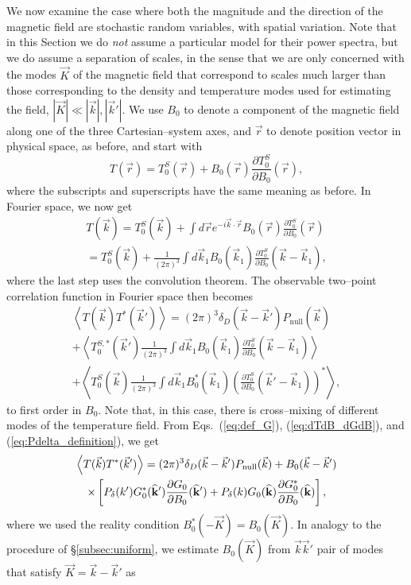 \documentclass[aps,prd,twocolumn,floatfix,showpacs,superscriptaddress,nofootinbib]{revtex4-1}
\newcommand{\beq}{\begin{equation}}
\newcommand{\eeq}{\end{equation}}
\newcommand{\bga}{\begin{gathered}}
\newcommand{\ega}{\end{gathered}}
\begin{document}
We now examine the case where both the magnitude and the direction of the magnetic field are stochastic random variables, with spatial variation. Note that in this Section we do \textit{not} assume a particular model for their power spectra, but we do assume a separation of scales, in the sense that we are only concerned with the modes $\vec K$ of the magnetic field that correspond to scales much larger than those corresponding to the density and temperature modes used for estimating the field, $|\vec K|\ll|\vec k|,|\vec k'|$. We use $B_0$ to denote a component of the magnetic field along one of the three Cartesian--system axes, and $\vec r$ to denote position vector in physical space, as before, and start with 
\beq
T(\vec r) = T^S_0(\vec r) + B_0(\vec r)\frac{\partial T^S_0}{\partial B_0}(\vec r),
\eeq
where the subscripts and superscripts have the same meaning as before. In Fourier space, we now get
\beq
\bga
T(\vec k) = T^S_0(\vec k) + \int d\vec r e^{-i\vec k \cdot \vec r} B_0(\vec r) \frac{\partial T^S_0}{\partial B_0}(\vec r)\\
= T^S_0(\vec k) + \frac{1}{(2\pi)^3}\int d\vec k_1B_0(\vec k_1) \frac{\partial T^S_0}{\partial B_0}(\vec k-\vec k_1),
\ega
\eeq
where the last step uses the convolution theorem. The observable two--point correlation function in Fourier space then becomes
\beq
\bga
\left < T(\vec k)T^*(\vec k')\right > = (2\pi)^3\delta_D(\vec k-\vec k')P_\text{null}(\vec k)\\
+ \left <T_0^{S,*}(\vec k')\frac{1}{(2\pi)^3}\int d\vec k_1 B_0(\vec k_1) \frac{\partial T^S_0}{\partial B_0}(\vec k-\vec k_1)\right > \\
+ \left <T^S_0(\vec k)\frac{1}{(2\pi)^3}\int d\vec k_1 B_0^*(\vec k_1) \left(\frac{\partial T^S_0}{\partial B_0}(\vec k'-\vec k_1)\right)^*\right >, 
\ega
\eeq
to first order in $B_0$. Note that, in this case, there is cross--mixing of different modes of the temperature field. From Eqs.~(\ref{eq:def_G}), (\ref{eq:dTdB_dGdB}), and (\ref{eq:Pdelta_definition}), we get
\beq
\bga
\left< T(\vec k)T^*(\vec k')\right> = (2\pi)^3\delta_D(\vec k - \vec k')  P_\text{null}(\vec k)+B_0(\vec k - \vec k')\\
\times\left[ P_\delta(k')G_0^*({\bf{\widehat k'}})\frac{\partial G_0}{\partial B_0}({\bf{\widehat k'}}) + P_\delta(k)G_0({\bf{\widehat k}})\frac{\partial G_0^*}{\partial B_0}({\bf{\widehat k}})\right],
\ega
\eeq
where we used the reality condition $B_0^*(-\vec K) = B_0(\vec K)$. In analogy to the procedure of \S\ref{subsec:uniform}, we estimate $B_0(\vec K)$ from $\vec k\vec k'$ pair of modes that satisfy $\vec K=\vec k-\vec k'$ as
\end{document}
